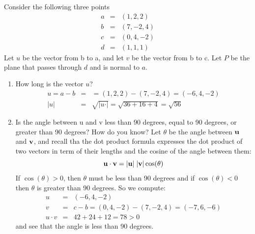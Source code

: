 \documentclass{book}
\newcommand{\vect}[1]{{\bf{ #1}}}
\begin{document}
Consider the following three points
\begin{eqnarray*}
a &=& (1, 2, 2) \\
b &=& (7, -2, 4) \\
c &=& (0, 4, -2) \\
d &=& (1, 1, 1)
\end{eqnarray*}
Let $u$ be the vector from b to a, and let $v$ be the vector from b to c.
Let $P$ be the plane that passes through $d$ and is normal to $a$.
\begin{enumerate}
\item How long is the vector $u$?
\newline
\begin{eqnarray*}
u = a-b &=&= (1,2,2)- (7,-2,4) = (-6, 4, -2) \\
\vert u \vert &=& \sqrt{\vert u \cdot \vert} = \sqrt{36+16+4} = \sqrt{56}
\end{eqnarray*}

\item Is the angle between u and v less than 90 degrees, equal to 90 degrees, or greater than 90 degrees? How do you know?
\newline
Let $\theta$ be the angle between $\vect u$ and $\vect v$, and recall tha the dot product formula
expresses the dot product of two vectors in term of their lengths and the cosine of the angle between them:
\[
  \vect{u}\cdot \vect{v} = \vert \vect{u} \vert \;  \vert \vect{v} \vert \cos(\theta)
\]
If $\cos(\theta) > 0$, then $\theta$ must be less than 90 degrees and if $\cos(\theta) < 0$ then $\theta$ is greater than
90 degrees. So we compute:
\begin{eqnarray*}
u &=& (-6,4,-2) \\
v &=& c-b = (0,4,-2)- (7,-2,4) = (-7,6,-6) \\
u\cdot v &=& 42 + 24 + 12 = 78 > 0
\end{eqnarray*}
and see that the angle is less than 90 degrees.


\end{enumerate}
\end{document}

